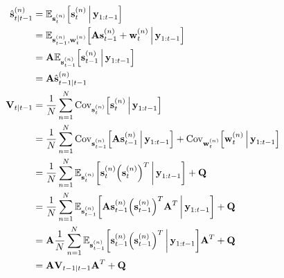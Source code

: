 		\begin{align*}
			\hat{\vec{s}}_{t \subgiven t - 1}^{(n)}
				&= \E_{\vec{s}_t^{(n)}}\Big[\vec{s}_t^{(n)} \Biggiven \vec{y}_{1:t - 1}\Big] \\
				&= \E_{\vec{s}_{t - 1}^{(n)}, \vec{w}_t^{(n)}}\Big[\mat{A} \vec{s}_{t - 1}^{(n)} + \vec{w}_t^{(n)} \Biggiven \vec{y}_{1:t - 1}\Big] \\
				&= \mat{A} \E_{\vec{s}_{t - 1}^{(n)}}\Big[\vec{s}_{t - 1}^{(n)} \Biggiven \vec{y}_{1:t - 1}\Big] \\
				&= \mat{A} \hat{\vec{s}}_{t - 1 \subgiven t - 1}^{(n)} \\
			\mat{V}_{t \subgiven t - 1}
				&= \frac{1}{N} \sum_{n = 1}^{N} \Cov_{\vec{s}_t^{(n)}}\!\Big[\vec{s}_t^{(n)} \Biggiven \vec{y}_{1:t - 1}\Big] \\
				&= \frac{1}{N} \sum_{n = 1}^{N} \Cov_{\vec{s}_{t - 1}^{(n)}}\!\Big[\mat{A} \vec{s}_{t - 1}^{(n)} \Biggiven \vec{y}_{1:t - 1}\Big] + \Cov_{\vec{w}_t^{(n)}}\!\Big[\vec{w}_t^{(n)} \Biggiven \vec{y}_{1:t - 1}\Big] \\
				&= \frac{1}{N} \sum_{n = 1}^{N} \E_{\vec{s}_t^{(n)}}\bigg[\vec{s}_t^{(n)} \Big(\vec{s}_t^{(n)}\Big)^T \bigggiven \vec{y}_{1:t - 1}\bigg] + \mat{Q} \\
				&= \frac{1}{N} \sum_{n = 1}^{N} \E_{\vec{s}_{t - 1}^{(n)}}\bigg[\mat{A} \vec{s}_{t - 1}^{(n)} \Big(\vec{s}_{t - 1}^{(n)}\Big)^T \mat{A}^T \bigggiven \vec{y}_{1:t - 1}\bigg] + \mat{Q} \\
				&= \mat{A} \frac{1}{N} \sum_{n = 1}^{N} \E_{\vec{s}_{t - 1}^{(n)}}\bigg[\vec{s}_{t - 1}^{(n)} \Big(\vec{s}_{t - 1}^{(n)}\Big)^T \bigggiven \vec{y}_{1:t - 1}\bigg] \mat{A}^T + \mat{Q} \\
				&= \mat{A} \mat{V}_{t - 1 \subgiven t - 1} \mat{A}^T + \mat{Q}
		\end{align*}
		
